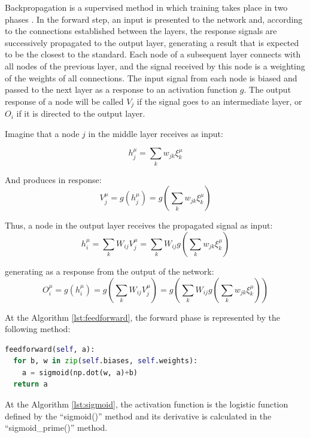 Backpropagation is a supervised method in which training takes place in two phases \cite{haykin1999}. In the forward step, an input is presented to the network and, according to the connections established between the layers, the response signals are successively propagated to the output layer, generating a result that is expected to be the closest to the standard. Each node of a subsequent layer connects with all nodes of the previous layer, and the signal received by this node is a weighting of the weights of all connections. The input signal from each node is biased and passed to the next layer as a response to an activation function $g$. The output response of a node will be called $V_j$ if the signal goes to an intermediate layer, or $O_i$ if it is directed to the output layer.

Imagine that a node $j$ in the middle layer receives as input:

\begin{equation}
\label{xisum1}
h_j^\mu=\sum_{k}w_{jk}\xi_k^\mu
\end{equation}

And produces in response:
\begin{equation}
\label{vequal}
V_j^\mu=g(h_j^\mu)=g(\sum_kw_{jk}\xi_k^\mu)
\end{equation}

Thus, a node in the output layer receives the propagated signal as input:
\begin{equation}
\label{sumsums}
h_i^\mu=\sum_kW_{ij}V_j^\mu=\sum_kW_{ij}g(\sum_kw_{jk}\xi_k^\mu)
\end{equation}

generating as a response from the output of the network:
\begin{equation}
\label{outeq}
O_i^\mu=g(h_i^\mu)=g(\sum_kW_{ij}V_j^\mu)=g(\sum_kW_{ij}g(\sum_kw_{jk}\xi_k^\mu))
\end{equation}

At the Algorithm \ref{lst:feedforward}, the forward phase is represented by the following method:

\begin{lstlisting}[caption={Delta method in Python},label={lst:feedforward},language=Python]
feedforward(self, a):
  for b, w in zip(self.biases, self.weights):
    a = sigmoid(np.dot(w, a)+b)
  return a
\end{lstlisting}

At the Algorithm \ref{lst:sigmoid}, the activation function is the logistic function defined by the “sigmoid()” method and its derivative is calculated in the “sigmoid\_prime()” method.

